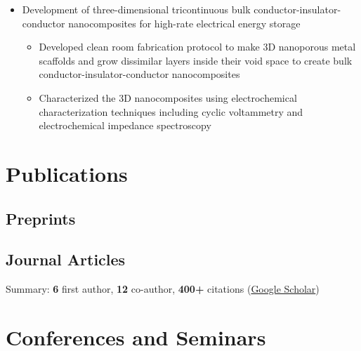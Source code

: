 \documentclass[11pt]{article} %
\begin{document}
\begin{itemize}
  \item Development of three-dimensional tricontinuous bulk conductor-insulator-conductor nanocomposites for high-rate electrical energy storage
    \begin{itemize}
      \item Developed clean room fabrication protocol to make 3D nanoporous metal scaffolds and grow dissimilar layers inside their void space to create bulk conductor-insulator-conductor nanocomposites
      \item Characterized the 3D nanocomposites using electrochemical characterization techniques including cyclic voltammetry and electrochemical impedance spectroscopy
    \end{itemize}
\end{itemize}

\section*{Publications}
\subsection*{Preprints}
\begin{refsection}
  \nocite{*}
  \printbibliography[heading=none, type=misc]
\end{refsection}

\subsection{Journal Articles}
Summary: \textbf{6} first author, \textbf{12} co-author, \textbf{400+} citations (\href{https://scholar.google.com/citations?user=WsQfglgAAAAJ&hl=en&authuser=1}{Google Scholar})

\begin{refsection}
  \nocite{*}
  \printbibliography[heading=none, type=article]
\end{refsection}

\section{Conferences and Seminars}
\setlength{\arrayrulewidth}{1mm} %
\renewcommand{\arraystretch}{1.4} %
\end{document}
